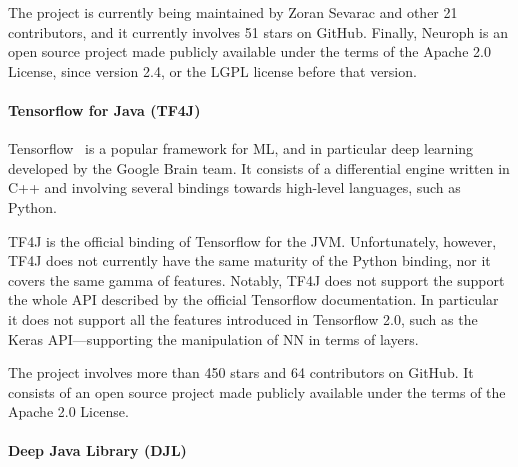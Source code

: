\documentclass[12pt,a4paper,openright,twoside]{book}
\begin{document}
The project is currently being maintained by Zoran Sevarac and other 21 contributors, and it currently involves 51 stars on GitHub.
%
Finally, Neuroph is an open source project made publicly available under the terms of the Apache 2.0 License, since version 2.4, or the LGPL license before that version.


\paragraph{Tensorflow for Java (TF4J)}

Tensorflow~\cite{tensorflow2015-whitepaper} is a popular framework for ML, and in particular deep learning developed by the Google Brain team.
%
It consists of a differential engine written in C++ and involving several bindings towards high-level languages, such as Python.

%
TF4J is the official binding of Tensorflow for the JVM.
Unfortunately, however, TF4J does not currently have the same maturity of the Python binding, nor it covers the same gamma of features.
%
Notably, TF4J does not support the support the whole API described by the official Tensorflow documentation.
%
In particular it does not support all the features introduced in Tensorflow 2.0, such as the Keras API---supporting the manipulation of NN in terms of layers.

The project involves more than 450 stars and 64 contributors on GitHub.
%
It consists of an open source project made publicly available under the terms of the Apache 2.0 License.

\paragraph{Deep Java Library (DJL)}
\end{document}
